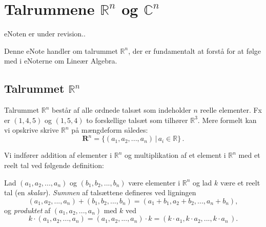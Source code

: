 
\setcounter{chapter}{0} %

\chapter{Talrummene $\mathbb R^n $ og $\mathbb C^n $} \label{tn1}

eNoten er under revision..

 

\begin{basis}
Denne eNote handler om talrummet $\mathbb R^n $, der er fundamentalt at forstå for at følge med i eNoterne om Lineær Algebra.
\end{basis}

\section{Talrummet $\mathbb R^n $}

Talrummet $\mathbb R ^n$ består af alle ordnede talsæt som indeholder $n$ reelle elementer. Fx er $(1,4,5)$ og $(1,5,4)$ to forskellige talsæt som tilhører $\mathbb R ^3$. Mere formelt kan vi opskrive skrive $\mathbb R ^n$ på mængdeform således:
\begin{equation}\label{eqRn}
\mathbf R ^n=\{(a_1,a_2,...,a_n)\,|\,a_i \in \mathbb R\}\,.
\end{equation}

Vi indfører addition af elementer i $\mathbb R ^n$ og multiplikation af et element i $\mathbb R ^n$ med et reelt tal ved følgende definition:

\begin{definition}\label{tn1.defRegneOP}
Lad $(a_1,a_2,...,a_n)$ og $(b_1,b_2,...,b_n)$ være elementer i $\mathbb R ^n$ og lad $k$ være et reelt tal (en \emph{skalar}).
\textit{Summen} af talsættene defineres ved ligningen
\begin{equation}\label{eqRnSum}
(a_1,a_2,...,a_n)+(b_1,b_2,...,b_n)=(a_1+b_1,a_2+b_2,...,a_n+b_n),
\end{equation}
og \textit{produktet} af $(a_1,a_2,...,a_n)$ med $k$ ved
\begin{equation}\label{eqRnMult}
k\cdot(a_1,a_2,...,a_n)=(a_1,a_2,...,a_n)\cdot k=(k\cdot a_1,k\cdot a_2,...,k\cdot a_n\,).
\end{equation}
\end{definition}

